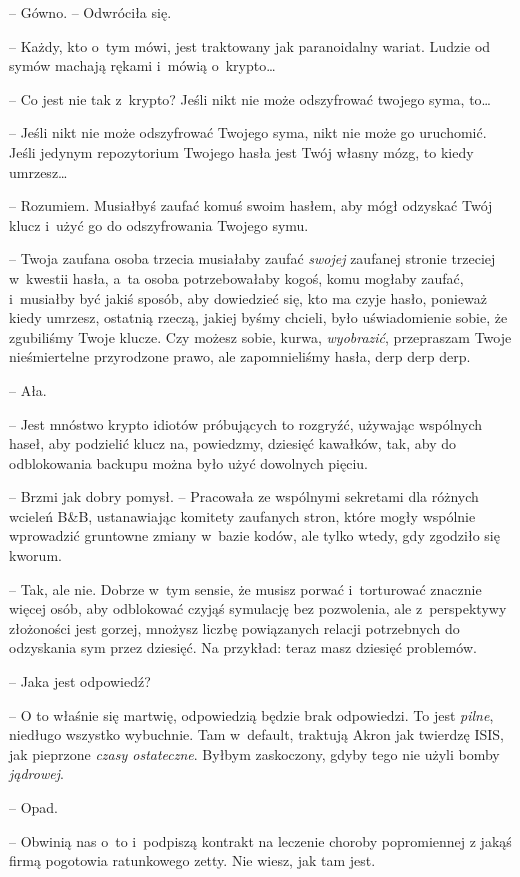 \documentclass[oneside,polish,11pt,sfheadings]{mwbk}
\begin{document}
-- Gówno. -- Odwróciła się.

-- Każdy, kto o~tym mówi, jest traktowany jak paranoidalny wariat. Ludzie
od symów machają rękami i~mówią o~krypto\ldots 

-- Co jest nie tak z~krypto? Jeśli nikt nie może odszyfrować twojego
syma, to\ldots 

-- Jeśli nikt nie może odszyfrować Twojego syma, nikt nie może go
uruchomić. Jeśli jedynym repozytorium Twojego hasła jest Twój własny
mózg, to kiedy umrzesz\ldots 

-- Rozumiem. Musiałbyś zaufać komuś swoim hasłem, aby mógł odzyskać Twój
klucz i~użyć go do odszyfrowania Twojego symu.

-- Twoja zaufana osoba trzecia musiałaby zaufać \textit{swojej} zaufanej
stronie trzeciej w~kwestii hasła, a~ta osoba potrzebowałaby kogoś, komu
mogłaby zaufać, i~musiałby być jakiś sposób, aby dowiedzieć się, kto ma
czyje hasło, ponieważ kiedy umrzesz, ostatnią rzeczą, jakiej byśmy
chcieli, było uświadomienie sobie, że zgubiliśmy Twoje klucze. Czy
możesz sobie, kurwa, \textit{wyobrazić}, przepraszam Twoje nieśmiertelne
przyrodzone prawo, ale zapomnieliśmy hasła, derp derp derp.

-- Ała.

-- Jest mnóstwo krypto idiotów próbujących to rozgryźć, używając
wspólnych haseł, aby podzielić klucz na, powiedzmy, dziesięć kawałków,
tak, aby do odblokowania backupu można było użyć dowolnych pięciu.

-- Brzmi jak dobry pomysł. -- Pracowała ze wspólnymi sekretami dla różnych
wcieleń B\&B, ustanawiając komitety zaufanych stron, które mogły
wspólnie wprowadzić gruntowne zmiany w~bazie kodów, ale tylko wtedy, gdy
zgodziło się kworum.

-- Tak, ale nie. Dobrze w~tym sensie, że musisz porwać i~torturować
znacznie więcej osób, aby odblokować czyjąś symulację bez pozwolenia,
ale z~perspektywy złożoności jest gorzej, mnożysz liczbę powiązanych
relacji potrzebnych do odzyskania sym przez dziesięć. Na przykład: teraz
masz dziesięć problemów.

-- Jaka jest odpowiedź?

-- O to właśnie się martwię, odpowiedzią będzie brak odpowiedzi. To jest
\textit{pilne}, niedługo wszystko wybuchnie. Tam w~default, traktują Akron
jak twierdzę ISIS, jak pieprzone \textit{czasy ostateczne}. Byłbym
zaskoczony, gdyby tego nie użyli bomby \textit{jądrowej}.

-- Opad.

-- Obwinią nas o~to i~podpiszą kontrakt na leczenie choroby popromiennej
z jakąś firmą pogotowia ratunkowego zetty. Nie wiesz, jak tam jest.
\end{document}

